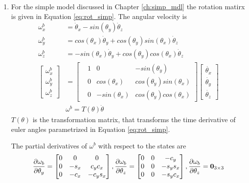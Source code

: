 \begin{enumerate}
\item For the simple model discussed in Chapter \ref{ch:simp_mdl} the rotation matirx is given in Equation \ref{eq:rot_simp}. The angular velocity is
\begin{equation}
	\begin{split}
	\omega_x^b &= \dot{\theta}_x - sin(\theta_y)\dot{\theta}_z \\
	\omega_y^b &= cos(\theta_x)\dot{\theta}_y + cos(\theta_y)sin(\theta_x)\dot{\theta}_z \\
	\omega_z^b &= -sin(\theta_x)\dot{\theta}_y + cos(\theta_y)cos(\theta_x)\dot{\theta}_z \\
	\begin{bmatrix}
	\omega_x^b\\ \omega_y^b\\ \omega_z^b
	\end{bmatrix}
	 &= 
	\begin{bmatrix}
	 &1 &0 &-sin(\theta_y)\\
	 &0  &cos(\theta_x) &cos(\theta_y)sin(\theta_x)\\
	 &0  &-sin(\theta_x) &cos(\theta_y)cos(\theta_x)
	\end{bmatrix}
	\begin{bmatrix}
			\dot{\theta_x} \\ \dot{\theta_y}\\ \dot{\theta_z}
	\end{bmatrix}\\
	&\omega^b = T(\theta) \dot{\theta}
	\end{split}
\end{equation}
$T(\theta)$ is the transformation matrix, that transforms the time derivative of euler angles parametrized in Equation \ref{eq:rot_simp}.

The partial derivatives of $\omega^b$ with respect to the states are
$$\frac{\partial {\omega_b}}{\partial {\theta_y}} = \begin{bmatrix}0 &0 &0\\ 0 &-s_x &c_yc_x\\ 0 &-c_x &-c_ys_x \end{bmatrix}, \frac{\partial {\omega_b}}{\partial {\theta_z}} = \begin{bmatrix}0 &0 &-c_y\\ 0 &0 &-s_ys_x\\ 0 &0 &-s_yc_x \end{bmatrix},\frac{\partial {\omega_b}}{\partial {\theta_z}} = \textbf{0}_{3\times 3} $$
\end{enumerate}

